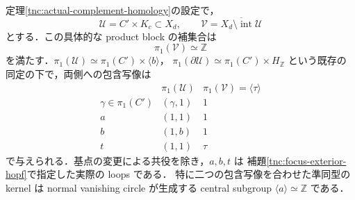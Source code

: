 \begin{theorem}
\label{tnc:actual-complement-pi1}
定理\ref{tnc:actual-complement-homology}の設定で，
\[
 \mathcal U=C'\times K_c\subset X_d,
 \qquad
 \mathcal V=\overline{X_d\setminus\operatorname{int}\mathcal U}
\]
とする．この具体的な product block の補集合は
\[
 \boxed{\pi_1(\mathcal V)\simeq\mathbb Z}
\]
を満たす．$\pi_1(\mathcal U)\simeq\pi_1(C')\times\langle b\rangle$，
$\pi_1(\partial\mathcal U)\simeq\pi_1(C')\times H_{\mathbb Z}$
という既存の同定の下で，両側への包含写像は
\[
\begin{array}{c|cc}
 &\pi_1(\mathcal U)&\pi_1(\mathcal V)=\langle\tau\rangle\\ \hline
 \gamma\in\pi_1(C')&(\gamma,1)&1\\
 a&(1,1)&1\\
 b&(1,b)&1\\
 t&(1,1)&\tau
\end{array}
\]
で与えられる．基点の変更による共役を除き，$a,b,t$ は
補題\ref{tnc:focus-exterior-hopf}で指定した実際の loops である．
特に二つの包含写像を合わせた準同型の kernel は
normal vanishing circle が生成する central subgroup
$\langle a\rangle\simeq\mathbb Z$ である．
\end{theorem}


